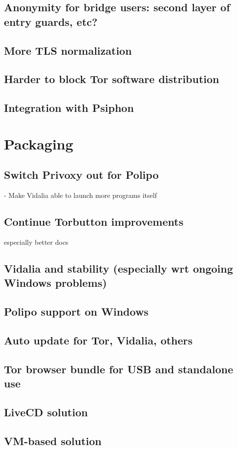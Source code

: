 \documentclass{article}
\begin{document}
\subsection{Anonymity for bridge users: second layer of entry guards, etc?}
\subsection{More TLS normalization}
\subsection{Harder to block Tor software distribution}
\subsection{Integration with Psiphon}
\section{Packaging}
\subsection{Switch Privoxy out for Polipo}
      - Make Vidalia able to launch more programs itself
\subsection{Continue Torbutton improvements}
      especially better docs
\subsection{Vidalia and stability (especially wrt ongoing Windows problems)}
\subsection{Polipo support on Windows}
\subsection{Auto update for Tor, Vidalia, others}
\subsection{Tor browser bundle for USB and standalone use}
\subsection{LiveCD solution}
\subsection{VM-based solution}
\end{document}
